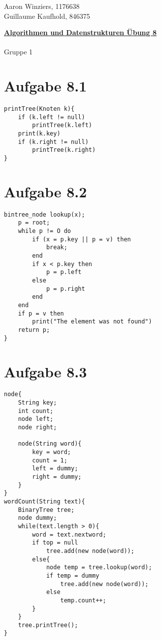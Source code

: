 \documentclass[10pt,a4paper]{article}
\begin{document}
	\begin{flushright}
		Aaron Winziers, 1176638	\\
		Guillaume Kaufhold, 846375
	\end{flushright}
	\begin{center}
		\underline{\textbf{Algorithmen und Datenstrukturen Übung 8}}
		\\~ \\ Gruppe 1
	\end{center}
	\section*{Aufgabe 8.1}		
\begin{lstlisting}
printTree(Knoten k){
	if (k.left != null)
		printTree(k.left)
	print(k.key)
	if (k.right != null)
		printTree(k.right)
}
\end{lstlisting}
	\section*{Aufgabe 8.2}
\begin{lstlisting}
bintree_node lookup(x);
	p = root;
	while p != O do
		if (x = p.key || p = v) then
			break;
		end
		if x < p.key then
			p = p.left
		else
			p = p.right
		end
	end
	if p = v then
		print("The element was not found")
	return p;
}
\end{lstlisting}
	
	\section*{Aufgabe 8.3}
\begin{lstlisting}
node{
	String key;
	int count;
	node left;
	node right;
	
	node(String word){
		key = word;
		count = 1;
		left = dummy;
		right = dummy;
	}
}
wordCount(String text){
	BinaryTree tree;
	node dummy;
	while(text.length > 0){
		word = text.nextword;
		if top = null
			tree.add(new node(word));
		else{
			node temp = tree.lookup(word);
			if temp = dummy
				tree.add(new node(word));
			else
				temp.count++;
		}
	}
	tree.printTree();
}
\end{lstlisting}	
\end{document}

